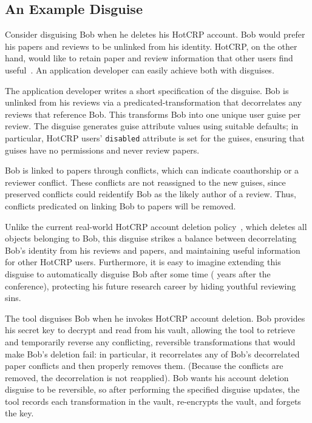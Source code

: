 \subsection{An Example Disguise}
\label{design:eg}
%
Consider disguising Bob when he deletes his HotCRP account.
%
Bob would prefer his papers and reviews to be unlinked from his identity.
%
HotCRP, on the other hand, would like to retain paper and review information that other users
find useful~\cite{hotcrp-privacy}.
%
An application developer can easily achieve both with disguises.
%

%
The application developer writes a short specification of the disguise.
%
Bob is unlinked from his
reviews via a predicated-transformation that decorrelates any reviews that reference Bob.
%
This transforms Bob into one unique user guise per review.
%
The disguise generates guise attribute values using suitable defaults;
%
in particular, HotCRP users' \texttt{disabled} attribute is set for the guises, ensuring that guises
have no permissions and never review papers.
%

%
Bob is linked to papers through conflicts, which can indicate coauthorship or a reviewer conflict.
%
These conflicts are not reassigned to the new guises, since preserved conflicts could reidentify Bob
as the likely author of a review. Thus, conflicts predicated on linking Bob to papers will be
removed.

Unlike the current real-world HotCRP account deletion policy~\cite{hotcrp:privacy}, which deletes
all objects belonging to Bob, this disguise strikes a balance between decorrelating Bob's identity
from his reviews and papers, and maintaining useful information for other HotCRP users.
%
Furthermore, it is easy to imagine extending this disguise to automatically disguise Bob after some
time ( years after the conference), protecting his future research career by hiding youthful
reviewing sins.
%

The tool disguises Bob when he invokes HotCRP account deletion. Bob provides his secret key to
decrypt and read from his vault, allowing the tool to retrieve and temporarily reverse any conflicting,
reversible transformations that would make Bob's deletion fail: in particular, it recorrelates any
of Bob's decorrelated paper conflicts and then properly removes them. (Because the conflicts are
removed, the decorrelation is not reapplied).  Bob wants his account deletion disguise to be
reversible, so after performing the specified disguise updates, the tool records each transformation
in the vault, re-encrypts the vault, and forgets the key.
